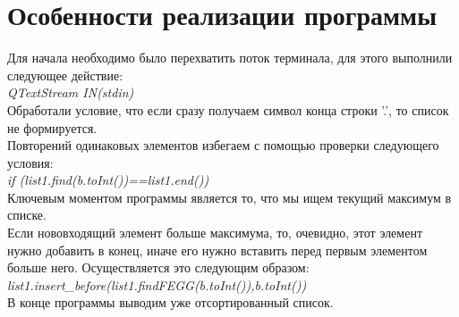 \documentclass[a4paper]{article}
\begin{document}
    {\section{Особенности реализации программы}
    Для начала необходимо было перехватить поток терминала, для этого выполнили следующее действие:\\
       \hfill\break
       \textit{QTextStream IN(stdin)}\\
       \hfill\break
    Обработали условие, что если сразу получаем символ конца строки '.', то список не формируется.\\
    Повторений одинаковых элементов избегаем с помощью проверки следующего условия:\\
       \hfill\break
       \textit{if (list1.find(b.toInt())==list1.end())}\\
       \hfill\break 
    Ключевым моментом программы является то, что мы ищем текущий максимум в списке.\\
    Если нововходящий элемент больше максимума, то, очевидно, этот элемент нужно добавить в конец, иначе его нужно вставить перед первым элементом больше него. Осуществляется это следующим образом:\\
       \hfill\break
       \textit{list1.insert\_before(list1.findFEGG(b.toInt()),b.toInt())}\\
       \hfill\break
    В конце программы выводим уже отсортированный список.    
            
    }   	            
\end{document}
